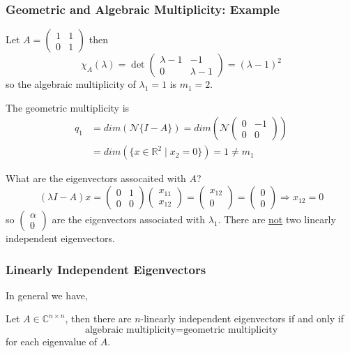 \documentclass{beamer}
\begin{document}
\begin{frame}\frametitle{Geometric and Algebraic Multiplicity: Example}
	Let 
	$A = \begin{pmatrix}
	    	1 & 1\\
			0 & 1
	  	  \end{pmatrix}$
 	then 
	\[ 
	\chi_A(\lambda) 
		= \det\begin{pmatrix}
	    		\lambda-1 & -1\\
				0 & \lambda-1
	  		   \end{pmatrix} 
	 	= (\lambda-1)^2
	\]
	so the algebraic multiplicity of $\lambda_1 = 1$ is $m_1 = 2$.
	
	The geometric multiplicity is
	\begin{align*}
		q_1 
			&= dim(
				\mathcal{N}\{I-A\})
			= dim(\mathcal{N}
				\begin{pmatrix}
	    			0 & -1\\
					0 & 0
	  			\end{pmatrix}) \\
	  		&= dim(\{x\in\mathbb{R}^2 \mid x_2 = 0\}) 
			= 1 \neq m_1 
	\end{align*}
	
	What are the eigenvectors assocaited with $A$?
	\[ 
		(\lambda I-A)x 
			= \begin{pmatrix}
	    		0 & 1\\
				0 & 0
	  		  \end{pmatrix}
			  \begin{pmatrix}
	    		x_{11}\\
				x_{12}
	  		  \end{pmatrix} = 
			  \begin{pmatrix}
	    		x_{12}\\
				0
	  		  \end{pmatrix}
			= \begin{pmatrix}
	    		0 \\ 0
	  		  \end{pmatrix}
			\Rightarrow x_{12} = 0 
	\]
	so $\begin{pmatrix}
	    \alpha\\0
	  \end{pmatrix}$ are the eigenvectors associated with $\lambda_1$.  There are \underline{not} two linearly independent eigenvectors.
\end{frame}

\begin{frame}\frametitle{Linearly Independent Eigenvectors}
	In general we have,
	\begin{lemma}
		Let $A \in \mathbb{C}^{n\times n}$, then there are
		$n$-linearly independent eigenvectors if and only if 
		\[
		\text{algebraic multiplicity} = \text{geometric multiplicity}
		\]
		for each eigenvalue of $A$.
	\end{lemma}
\end{frame}
\end{document}
